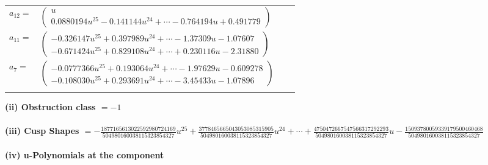 \documentclass[1p]{elsarticle_modified}
\theoremstyle{definition}
\begin{document}
\begin{tabular}{m{7pt} m{180pt} m{7pt} m{180pt} }
\flushright $a_{12}=$&$\begin{pmatrix}u\\0.0880194 u^{25}-0.141144 u^{24}+\cdots-0.764194 u+0.491779\end{pmatrix}$ \\
\flushright $a_{11}=$&$\begin{pmatrix}-0.326147 u^{25}+0.397989 u^{24}+\cdots-1.37309 u-1.07607\\-0.671424 u^{25}+0.829108 u^{24}+\cdots+0.230116 u-2.31880\end{pmatrix}$ \\
\flushright $a_{7}=$&$\begin{pmatrix}-0.0777366 u^{25}+0.193064 u^{24}+\cdots-1.97629 u-0.609278\\-0.108030 u^{25}+0.293691 u^{24}+\cdots-3.45433 u-1.07896\end{pmatrix}$\\&\end{tabular}
\flushleft \textbf{(ii) Obstruction class $= -1$}\\~\\
\flushleft \textbf{(iii) Cusp Shapes $= -\frac{1877165613022592980724169}{504980160038115323854327} u^{25}+\frac{3778465665043053085315905}{504980160038115323854327} u^{24}+\cdots+\frac{4750472667547566317292293}{504980160038115323854327} u-\frac{15093780059339179500460468}{504980160038115323854327}$}\\~\\
\newpage\renewcommand{\arraystretch}{1}
\flushleft \textbf{(iv) u-Polynomials at the component}\newline \\
\end{document}
